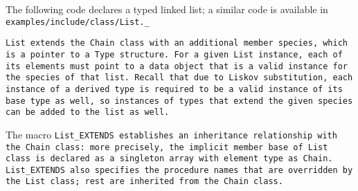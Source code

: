 The following code declares a typed linked list;
a similar code is available in \tt{examples/include/class/List._}


\tt{List} extends the \tt{Chain} class with an additional
member \tt{species}, which is a pointer to a \tt{Type} structure.
For a given \tt{List} instance, each of its elements must point to a
data object that is a valid instance for the \tt{species} of that list.
Recall that due to Liskov substitution, each instance of a derived type is
required to be a valid instance of its base type as well, so instances of
types that extend the given \tt{species} can be added to the list as well.

The macro \tt{List_EXTENDS} establishes an inheritance relationship with the
\tt{Chain} class: more precisely, the implicit member \tt{base} of \tt{List}
class is declared as a singleton array with element type as \tt{Chain}.
\tt{List_EXTENDS} also specifies the procedure names that are overridden
by the \tt{List} class; rest are inherited from the \tt{Chain} class.

